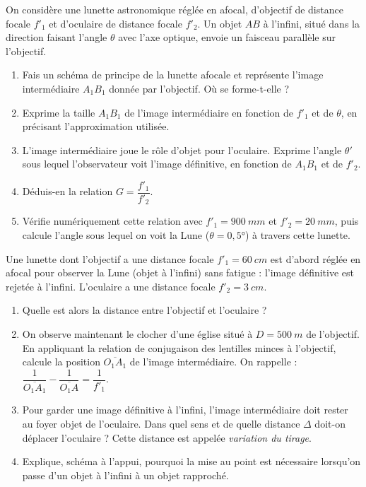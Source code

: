 \documentclass[11pt]{article}
\begin{document}
\begin{exercice}
On considère une lunette astronomique réglée en afocal, d'objectif de distance focale $f'_1$ et d'oculaire de distance focale $f'_2$. Un objet $AB$ à l'infini, situé dans la direction faisant l'angle $\theta$ avec l'axe optique, envoie un faisceau parallèle sur l'objectif.
\begin{enumerate}
\item Fais un schéma de principe de la lunette afocale et représente l'image intermédiaire $A_1B_1$ donnée par l'objectif. Où se forme-t-elle ?
\item Exprime la taille $A_1B_1$ de l'image intermédiaire en fonction de $f'_1$ et de $\theta$, en précisant l'approximation utilisée.
\item L'image intermédiaire joue le rôle d'objet pour l'oculaire. Exprime l'angle $\theta'$ sous lequel l'observateur voit l'image définitive, en fonction de $A_1B_1$ et de $f'_2$.
\item Déduis-en la relation $G = \dfrac{f'_1}{f'_2}$.
\item Vérifie numériquement cette relation avec $f'_1 = \SI{900}{mm}$ et $f'_2 = \SI{20}{mm}$, puis calcule l'angle sous lequel on voit la Lune ($\theta = 0,5°$) à travers cette lunette.
\end{enumerate}
\end{exercice}

\begin{exercice}
Une lunette dont l'objectif a une distance focale $f'_1 = \SI{60}{cm}$ est d'abord réglée en afocal pour observer la Lune (objet à l'infini) sans fatigue : l'image définitive est rejetée à l'infini. L'oculaire a une distance focale $f'_2 = \SI{3}{cm}$.
\begin{enumerate}
\item Quelle est alors la distance entre l'objectif et l'oculaire ?
\item On observe maintenant le clocher d'une église situé à $D = \SI{500}{m}$ de l'objectif. En appliquant la relation de conjugaison des lentilles minces à l'objectif, calcule la position $\overline{O_1A_1}$ de l'image intermédiaire. On rappelle : $\dfrac{1}{\overline{O_1A_1}} - \dfrac{1}{\overline{O_1A}} = \dfrac{1}{f'_1}$.
\item Pour garder une image définitive à l'infini, l'image intermédiaire doit rester au foyer objet de l'oculaire. Dans quel sens et de quelle distance $\Delta$ doit-on déplacer l'oculaire ? Cette distance est appelée \emph{variation du tirage}.
\item Explique, schéma à l'appui, pourquoi la mise au point est nécessaire lorsqu'on passe d'un objet à l'infini à un objet rapproché.
\end{enumerate}
\end{exercice}
\end{document}
